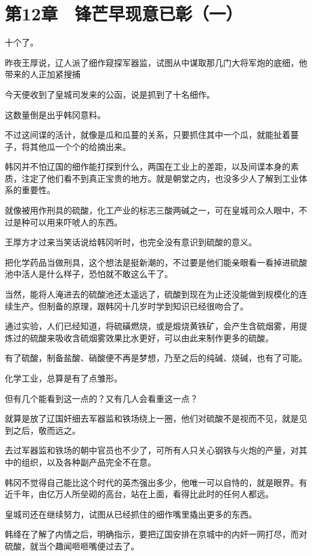 \section{第12章　锋芒早现意已彰（一）}

十个了。

昨夜王厚说，辽人派了细作窥探军器监，试图从中谋取那几门大将军炮的底细，他带来的人正加紧搜捕

今天便收到了皇城司发来的公函，说是抓到了十名细作。

这数量倒是出乎韩冈意料。

不过这间谍的活计，就像是瓜和瓜蔓的关系，只要抓住其中一个瓜，就能扯着蔓子，将其他瓜一个个的给摘出来。

韩冈并不怕辽国的细作能打探到什么，两国在工业上的差距，以及间谍本身的素质，注定了他们看不到真正宝贵的地方。就是朝堂之内，也没多少人了解到工业体系的重要性。

就像被用作刑具的硫酸，化工产业的标志三酸两碱之一，可在皇城司众人眼中，不过是种可以用来吓唬人的东西。

王厚方才过来当笑话说给韩冈听时，也完全没有意识到硫酸的意义。

把化学药品当做刑具，这个想法是挺新潮的，不过要是他们能亲眼看一看掉进硫酸池中活人是什么样子，恐怕就不敢这么干了。

当然，能将人淹进去的硫酸池还太遥远了，硫酸到现在为止还没能做到规模化的连续生产。但制备的原理，跟韩冈十几岁时学到知识已经很吻合了。

通过实验，人们已经知道，将硫磺燃烧，或是煅烧黄铁矿，会产生含硫烟雾，用提炼过的硫酸来吸收含硫烟雾效果比水更好，可以由此来制作更多的硫酸。

有了硫酸，制备盐酸、硝酸便不再是梦想，乃至之后的纯碱、烧碱，也有了可能。

化学工业，总算是有了点雏形。

但有几个能看到这一点的？又有几人会看重这一点？

就算是放了辽国奸细去军器监和铁场绕上一圈，他们对硫酸不是视而不见，就是见到之后，敬而远之。

去过军器监和铁场的朝中官员也不少了，可所有人只关心钢铁与火炮的产量，对其中的组织，以及各种副产品完全不在意。

韩冈不觉得自己能比这个时代的英杰强出多少，他唯一可以自恃的，就是眼界。有近千年，由亿万人所垒砌的高台，站在上面，看得比此时的任何人都远。

皇城司还在继续努力，试图从已经抓住的细作嘴里撬出更多的东西。

韩绛在了解了内情之后，明确指示，要把辽国安排在京城中的内奸一网打尽，而对硫酸，就当个趣闻咂咂嘴便过去了。

